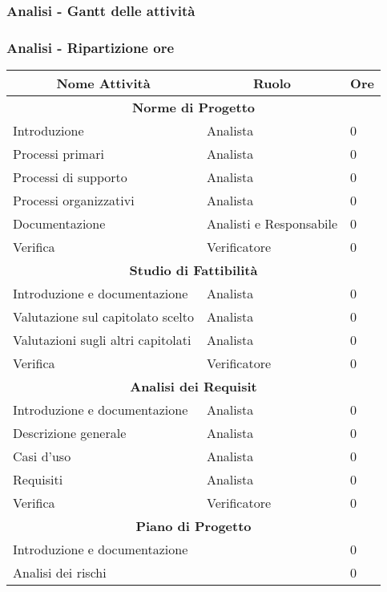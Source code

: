 \subsubsection{Analisi - Gantt delle attività}

\subsubsection{Analisi - Ripartizione ore}
\begin{table}[]
\begin{tabular}{|l|l|l|}
\hline
\multicolumn{1}{|c|}{\textbf{Nome Attività}} & \multicolumn{1}{c|}{\textbf{Ruolo}} & \multicolumn{1}{c|}{\textbf{Ore}} \\ \hline
\multicolumn{3}{|c|}{\textbf{Norme di Progetto}} \\ \hline
Introduzione & Analista & 0 \\ \hline
Processi primari & Analista & 0 \\ \hline
Processi di supporto & Analista & 0 \\ \hline
Processi organizzativi & Analista & 0 \\ \hline
Documentazione & Analisti e Responsabile & 0 \\ \hline
Verifica & Verificatore & 0 \\ \hline
\multicolumn{3}{|c|}{\textbf{Studio di Fattibilità}} \\ \hline
Introduzione e documentazione & Analista & 0 \\ \hline
Valutazione sul capitolato scelto & Analista & 0 \\ \hline
Valutazioni sugli altri capitolati  & Analista & 0 \\ \hline
Verifica & Verificatore & 0 \\ \hline
\multicolumn{3}{|c|}{\textbf{Analisi dei Requisit}} \\ \hline
Introduzione e documentazione & Analista & 0 \\ \hline
Descrizione generale & Analista & 0 \\ \hline
Casi d'uso & Analista & 0 \\ \hline
Requisiti & Analista & 0 \\ \hline
Verifica & Verificatore & 0 \\ \hline
\multicolumn{3}{|c|}{\textbf{Piano di Progetto}} \\ \hline
Introduzione e documentazione & & 0 \\ \hline
Analisi dei rischi & & 0 \\ \hline

\end{tabular}
\end{table}
